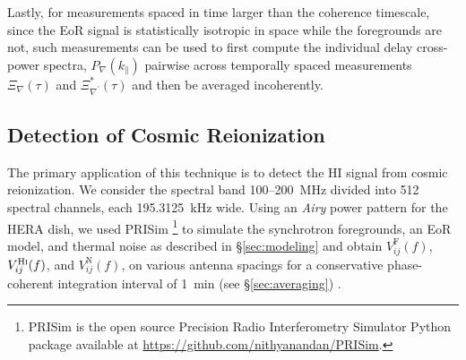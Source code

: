 \documentclass[
reprint,
superscriptaddress,
amsmath,
amssymb,
aps,
prd
]{revtex4-1}
\begin{document}
Lastly, for measurements spaced in time larger than the coherence timescale,  since the EoR signal is statistically isotropic in space while the foregrounds are not, such measurements can be used to first compute the individual delay cross-power spectra, $P_\nabla(k_\parallel)$ pairwise across temporally spaced measurements $\Xi_\nabla(\tau)$ and $\Xi_{\nabla^\prime}^*(\tau)$ and then be averaged incoherently. 


\subsection{Detection of Cosmic Reionization}\label{sec:EoR-detection}

The primary application of this technique is to detect the HI signal from cosmic reionization. We consider the spectral band 100--200~MHz divided into 512 spectral channels, each 195.3125~kHz wide. Using an {\it Airy} power pattern for the HERA dish, we used PRISim \footnote{PRISim is the open source Precision Radio Interferometry Simulator Python package available at \href{https://github.com/nithyanandan/PRISim}{https://github.com/nithyanandan/PRISim}.} to simulate the synchrotron foregrounds, an EoR model, and thermal noise as described in \S\ref{sec:modeling} and obtain $V_{ij}^\textrm{F}(f)$, $V_{ij}^\textrm{H{\sc i}}(f)$, and $V_{ij}^\textrm{N}(f)$, on various antenna spacings for a conservative phase-coherent integration interval of 1~min (see \S\ref{sec:averaging}) \cite{car18}. %
\end{document}
